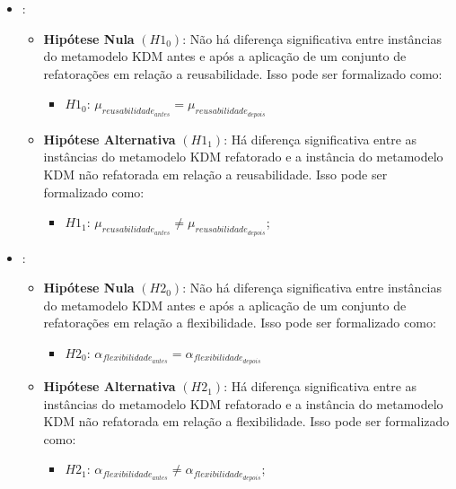 \begin{itemize}

\item {}:

\begin{itemize}
\item \textbf{Hipótese Nula} \textbf{$(H1_{0})$}: Não há diferença significativa entre instâncias do metamodelo KDM antes e após a aplicação de um conjunto de refatorações em relação a reusabilidade. Isso pode ser formalizado como: 

\begin{itemize}
\item $H1_{0}$: $\mu_{reusabilidade_{antes}} = \mu_{reusabilidade_{depois}}$
\end{itemize}

\item \textbf{Hipótese Alternativa} \textbf{$(H1_{1})$}: Há diferença significativa entre as instâncias do metamodelo KDM refatorado e a instância do metamodelo KDM não refatorada em relação a reusabilidade. Isso pode ser formalizado como: 

\begin{itemize}
\item $H1_{1}$: $\mu_{reusabilidade_{antes}} \neq \mu_{reusabilidade_{depois}}$;
\end{itemize}
\end{itemize}

\item {}:

\begin{itemize}
\item \textbf{Hipótese Nula} \textbf{$(H2_{0})$}: Não há diferença significativa entre instâncias do metamodelo KDM antes e após a aplicação de um conjunto de refatorações em relação a flexibilidade. Isso pode ser formalizado como: 

\begin{itemize}
\item $H2_{0}$: $\alpha_{flexibilidade_{antes}} = \alpha_{flexibilidade_{depois}}$
\end{itemize}

\item \textbf{Hipótese Alternativa} \textbf{$(H2_{1})$}: Há diferença significativa entre as instâncias do metamodelo KDM refatorado e a instância do metamodelo KDM não refatorada em relação a flexibilidade. Isso pode ser formalizado como: 

\begin{itemize}
\item $H2_{1}$: $\alpha_{flexibilidade_{antes}} \neq \alpha_{flexibilidade_{depois}}$;
\end{itemize}
\end{itemize}


\end{itemize}
